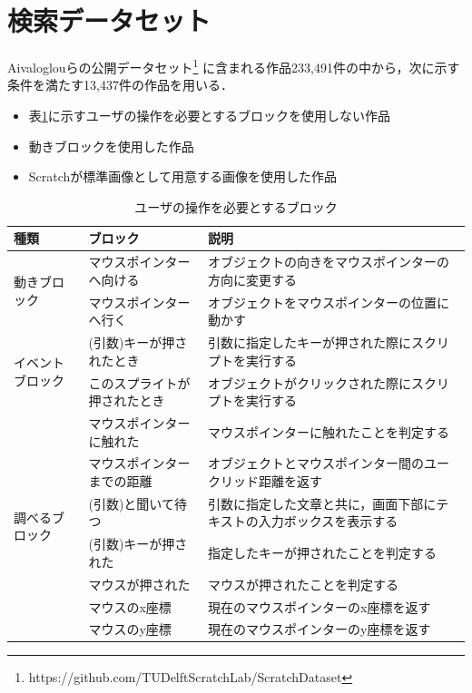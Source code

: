\documentclass[11pt]{jreport}
\begin{document}
\section{検索データセット}
Aivaloglouらの公開データセット\cite{dataset}\footnote{https://github.com/TUDelftScratchLab/ScratchDataset}
に含まれる作品233,491件の中から，次に示す条件を満たす13,437件の作品を用いる．
\begin{itemize}
    \item 表\ref{interactionblock}に示すユーザの操作を必要とするブロックを使用しない作品
    \item 動きブロックを使用した作品
    \item Scratchが標準画像として用意する画像を使用した作品
\end{itemize}

\begin{table}
    \caption{ユーザの操作を必要とするブロック}
    \label{interactionblock}
    \centering
    \begin{tabularx}{\textwidth}{l|l|X}
    \hline
        種類 & ブロック & 説明 \\
        \hline \hline
        \multirow{2}{*}{動きブロック} 
        & マウスポインターへ向ける & オブジェクトの向きをマウスポインターの方向に変更する \\
        \cline{2-3}
        & マウスポインターへ行く & オブジェクトをマウスポインターの位置に動かす \\
        \hline
        \multirow{2}{*}{イベントブロック}
        & (引数)キーが押されたとき & 引数に指定したキーが押された際にスクリプトを実行する \\
        \cline{2-3}
        & このスプライトが押されたとき & オブジェクトがクリックされた際にスクリプトを実行する \\
        \hline
        \multirow{7}{*}{調べるブロック} & マウスポインターに触れた & マウスポインターに触れたことを判定する \\
        \cline{2-3}
        & マウスポインターまでの距離 & オブジェクトとマウスポインター間のユークリッド距離を返す \\
        \cline{2-3}
        & (引数)と聞いて待つ & 引数に指定した文章と共に，画面下部にテキストの入力ボックスを表示する \\
        \cline{2-3}
        & (引数)キーが押された & 指定したキーが押されたことを判定する \\
        \cline{2-3}
        & マウスが押された & マウスが押されたことを判定する \\
        \cline{2-3}
        & マウスのx座標 & 現在のマウスポインターのx座標を返す \\
        \cline{2-3}
        & マウスのy座標 & 現在のマウスポインターのy座標を返す \\
        \hline
    \end{tabularx}
\end{table}
\end{document}
